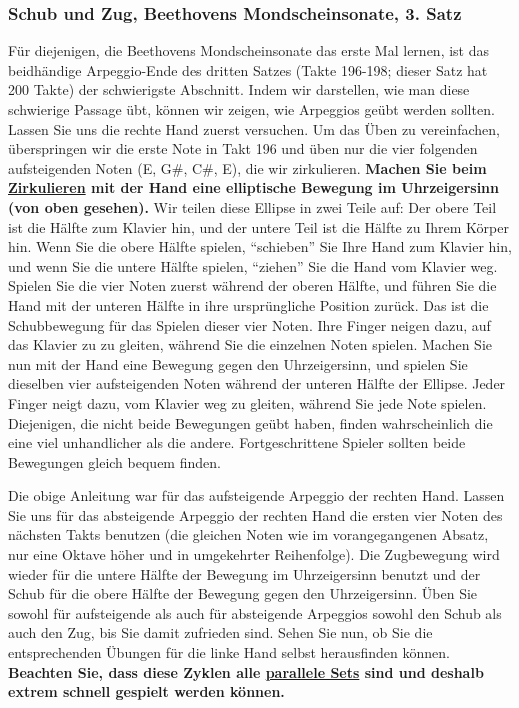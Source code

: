 \label{c1iii5f}
\subsubsection{Schub und Zug, Beethovens Mondscheinsonate, 3. Satz}
\label{c1iii5SchubZug}

Für diejenigen, die Beethovens Mondscheinsonate das erste Mal lernen, ist das beidhändige Arpeggio-Ende des dritten Satzes (Takte 196-198; dieser Satz hat 200 Takte) der schwierigste Abschnitt.
Indem wir darstellen, wie man diese schwierige Passage übt, können wir zeigen, wie Arpeggios geübt werden sollten.
Lassen Sie uns die rechte Hand zuerst versuchen.
Um das Üben zu vereinfachen, überspringen wir die erste Note in Takt 196 und üben nur die vier folgenden aufsteigenden Noten (E, G\#, C\#, E), die wir zirkulieren.
\textbf{Machen Sie beim \hyperref[c1iii2]{Zirkulieren} mit der Hand eine elliptische Bewegung im Uhrzeigersinn (von oben gesehen).}
Wir teilen diese Ellipse in zwei Teile auf: Der obere Teil ist die Hälfte zum Klavier hin, und der untere Teil ist die Hälfte zu Ihrem Körper hin.
Wenn Sie die obere Hälfte spielen, \enquote{schieben} Sie Ihre Hand zum Klavier hin, und wenn Sie die untere Hälfte spielen, \enquote{ziehen} Sie die Hand vom Klavier weg.
Spielen Sie die vier Noten zuerst während der oberen Hälfte, und führen Sie die Hand mit der unteren Hälfte in ihre ursprüngliche Position zurück.
Das ist die Schubbewegung für das Spielen dieser vier Noten.
Ihre Finger neigen dazu, auf das Klavier zu zu gleiten, während Sie die einzelnen Noten spielen.
Machen Sie nun mit der Hand eine Bewegung gegen den Uhrzeigersinn, und spielen Sie dieselben vier aufsteigenden Noten während der unteren Hälfte der Ellipse.
Jeder Finger neigt dazu, vom Klavier weg zu gleiten, während Sie jede Note spielen.
Diejenigen, die nicht beide Bewegungen geübt haben, finden wahrscheinlich die eine viel unhandlicher als die andere.
Fortgeschrittene Spieler sollten beide Bewegungen gleich bequem finden.

Die obige Anleitung war für das aufsteigende Arpeggio der rechten Hand.
Lassen Sie uns für das absteigende Arpeggio der rechten Hand die ersten vier Noten des nächsten Takts benutzen (die gleichen Noten wie im vorangegangenen Absatz, nur eine Oktave höher und in umgekehrter Reihenfolge).
Die Zugbewegung wird wieder für die untere Hälfte der Bewegung im Uhrzeigersinn benutzt und der Schub für die obere Hälfte der Bewegung gegen den Uhrzeigersinn.
Üben Sie sowohl für aufsteigende als auch für absteigende Arpeggios sowohl den Schub als auch den Zug, bis Sie damit zufrieden sind.
Sehen Sie nun, ob Sie die entsprechenden Übungen für die linke Hand selbst herausfinden können.
\textbf{Beachten Sie, dass diese Zyklen alle \hyperref[c1ii11]{parallele Sets} sind und deshalb extrem schnell gespielt werden können.}


